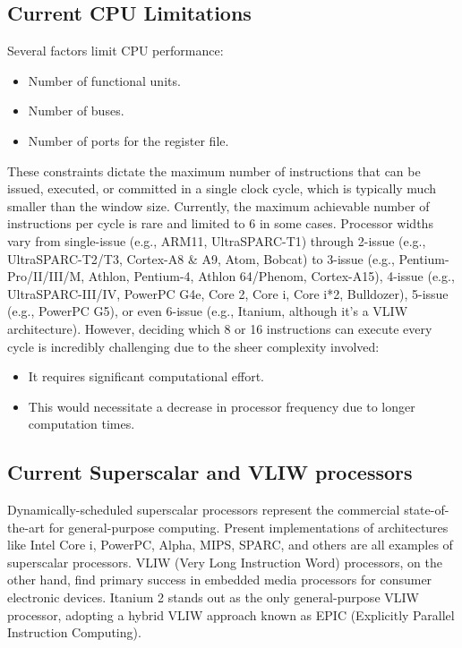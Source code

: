 \subsection{Current CPU Limitations}
Several factors limit CPU performance:
\begin{itemize}
    \item Number of functional units.
    \item Number of buses.
    \item Number of ports for the register file.
\end{itemize}
These constraints dictate the maximum number of instructions that can be issued, executed, or committed in a single clock cycle, which is typically much smaller than the window size.
Currently, the maximum achievable number of instructions per cycle is rare and limited to 6 in some cases. Processor widths vary from single-issue (e.g., ARM11, UltraSPARC-T1) through 2-issue (e.g., UltraSPARC-T2/T3, Cortex-A8 \& A9, Atom, Bobcat) to 3-issue (e.g., Pentium-Pro/II/III/M, Athlon, Pentium-4, Athlon 64/Phenom, Cortex-A15), 4-issue (e.g., UltraSPARC-III/IV, PowerPC G4e, Core 2, Core i, Core i*2, Bulldozer), 5-issue (e.g., PowerPC G5), or even 6-issue (e.g., Itanium, although it's a VLIW architecture).
However, deciding which 8 or 16 instructions can execute every cycle is incredibly challenging due to the sheer complexity involved:
\begin{itemize}
    \item It requires significant computational effort.
    \item This would necessitate a decrease in processor frequency due to longer computation times.
\end{itemize}

\subsection{Current Superscalar and VLIW processors}
Dynamically-scheduled superscalar processors represent the commercial state-of-the-art for general-purpose computing. 
Present implementations of architectures like Intel Core i, PowerPC, Alpha, MIPS, SPARC, and others are all examples of superscalar processors.
VLIW (Very Long Instruction Word) processors, on the other hand, find primary success in embedded media processors for consumer electronic devices.
Itanium 2 stands out as the only general-purpose VLIW processor, adopting a hybrid VLIW approach known as EPIC (Explicitly Parallel Instruction Computing).


